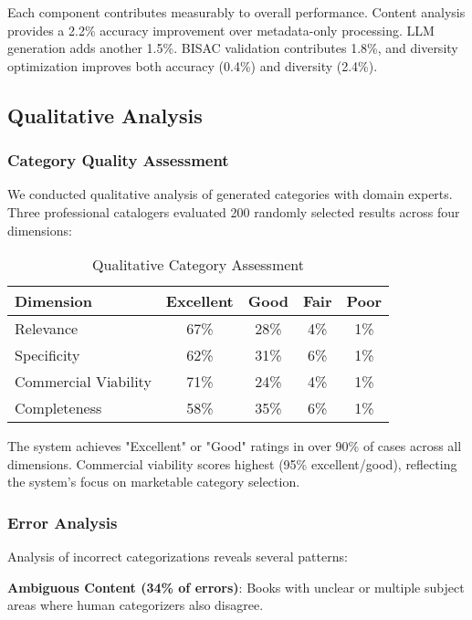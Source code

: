 \documentclass{article}
\begin{document}
Each component contributes measurably to overall performance. Content analysis provides a 2.2\% accuracy improvement over metadata-only processing. LLM generation adds another 1.5\%. BISAC validation contributes 1.8\%, and diversity optimization improves both accuracy (0.4\%) and diversity (2.4\%).

\subsection{Qualitative Analysis}

\subsubsection{Category Quality Assessment}

We conducted qualitative analysis of generated categories with domain experts. Three professional catalogers evaluated 200 randomly selected results across four dimensions:

\begin{table}[ht]
\centering
\caption{Qualitative Category Assessment}
\label{tab:qualitative_results}
\begin{tabular}{@{}lcccc@{}}
\toprule
Dimension & Excellent & Good & Fair & Poor \\
\midrule
Relevance & 67\% & 28\% & 4\% & 1\% \\
Specificity & 62\% & 31\% & 6\% & 1\% \\
Commercial Viability & 71\% & 24\% & 4\% & 1\% \\
Completeness & 58\% & 35\% & 6\% & 1\% \\
\bottomrule
\end{tabular}
\end{table}

The system achieves "Excellent" or "Good" ratings in over 90\% of cases across all dimensions. Commercial viability scores highest (95\% excellent/good), reflecting the system's focus on marketable category selection.

\subsubsection{Error Analysis}

Analysis of incorrect categorizations reveals several patterns:

\textbf{Ambiguous Content (34\% of errors)}: Books with unclear or multiple subject areas where human categorizers also disagree.
\end{document}
